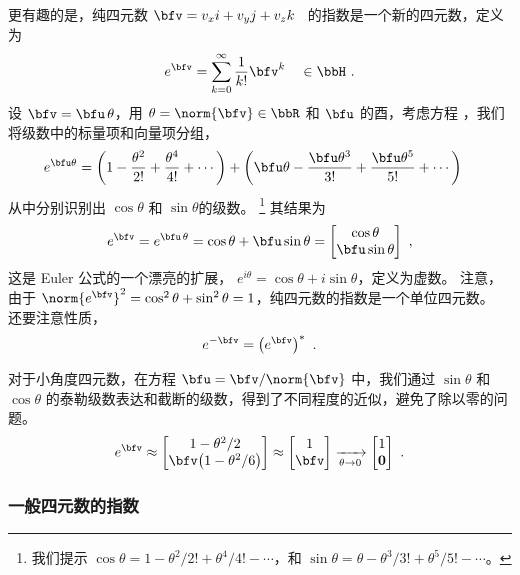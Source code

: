 更有趣的是，纯四元数 $\bfv=v_xi+v_yj+v_zk$~ 的指数是一个新的四元数，定义为
%
\begin{align}
e^\bfv
= \sum_{k=0}^\infty \frac{1}{k!}\bfv^k \quad \in \bbH
~.
\label{equ:pureQuatExpSeries}
\end{align}
%
设 $\bfv=\bfu\,\theta$，用 $\theta=\norm{\bfv}\in\bbR$ 和 $\bfu$ 的酉，考虑方程  ，我们将级数中的标量项和向量项分组， 
%
\begin{align}
e^{\bfu\theta} 
&= \left(1-\frac{\theta^2}{2!}+\frac{\theta^4}{4!}+\cdots\right) + \left(\bfu\theta - \frac{\bfu\theta^3}{3!}+\frac{\bfu\theta^5}{5!}+\cdots\right)
\end{align}
%
从中分别识别出 $\cos\theta$ 和 $\sin\theta$的级数。
% 
%
\footnote{我们提示 $\cos \theta = 1 - \theta^2/2! + \theta^4/4! - \cdots$，和 $\sin \theta =  \theta - \theta^3/3! + \theta^5/5! - \cdots$。}
%
其结果为
%
\begin{align}
e^\bfv
= e^{\bfu\,\theta} 
= \cos\theta + \bfu\sin\theta = \begin{bmatrix}
\cos\theta \\ \bfu\sin\theta 
\end{bmatrix} ~,
\label{equ:EulerFormulaQuat}
\end{align}
%
这是 Euler 公式的一个漂亮的扩展， $e^{i\theta}=\cos\theta+i\sin\theta$，定义为虚数。 
%
注意，由于 $\norm{e^{\bfv}}^2=\cos^2\theta+\sin^2\theta=1$，纯四元数的指数是一个单位四元数。
还要注意性质，
%
\begin{align}
e^{-\bfv} = \left(e^{\bfv}\right)^*
~.
\end{align}

对于小角度四元数，在方程 $\bfu=\bfv/\norm{\bfv}$ 中，我们通过 $\sin\theta$ 和 $\cos\theta$ 的泰勒级数表达和截断的级数，得到了不同程度的近似，避免了除以零的问题。
%
\begin{align}
e^\bfv 
\approx
\begin{bmatrix}
1-\theta^2/2 \\ \bfv\big(1-\theta^2/6\big) 
\end{bmatrix}
\approx
\begin{bmatrix}
1 \\ \bfv 
\end{bmatrix}
\xrightarrow[\theta\to 0]{}
\begin{bmatrix}
1 \\ {\bf0}
\end{bmatrix}
~.
\end{align}
%


\subsubsection{一般四元数的指数}


